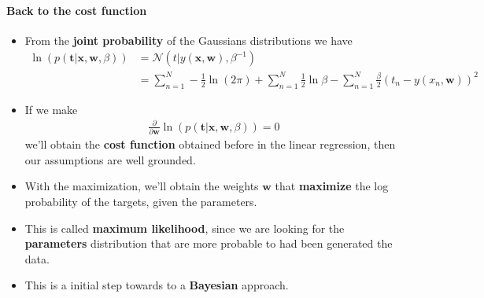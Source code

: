 \begin{frame}{\insertsubsection}
	\framesubtitle{Back to the cost function}
	\begin{itemize}
		\item From the \textcolor{UniOrange}{\textbf{joint probability}} of the Gaussians distributions we have
		\begin{align*}
				\ln \left( p( \mathbf{t}| \mathbf{x}, \mathbf{w}, \beta) \right) 
				&= \mathcal{N} \left( t | y(\mathbf{x}, \mathbf{w}), \beta^{-1} \right) \\
				&= \sum_{n=1}^N - \frac{1}{2} \ln (2 \pi) + \sum_{n=1}^N \frac{1}{2} \ln \beta - \sum_{n=1}^N \frac{\beta}{2} (t_n -  y(x_n, \mathbf{w}))^2
		\end{align*}
		\item If we make
		\begin{align*}
			\frac{\partial}{\partial \mathbf{w}}\ln \left( p( \mathbf{t}| \mathbf{x}, \mathbf{w}, \beta) \right) = 0
		\end{align*}
		we'll obtain the \textcolor{UniOrange}{\textbf{cost function}} obtained before in the linear regression, then our assumptions are well grounded.
		\item With the maximization, we'll obtain the weights $\mathbf{w}$ that \textcolor{UniOrange}{\textbf{maximize}} the log probability of the targets, given the parameters.
		\item This is called \textcolor{UniOrange}{\textbf{maximum likelihood}}, since we are looking for the \textcolor{UniOrange}{\textbf{parameters}} distribution that are more probable to had been generated the data.
		\item This is a initial step towards to a \textcolor{UniOrange}{\textbf{Bayesian}} approach.
	\end{itemize}
\end{frame}